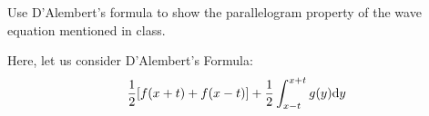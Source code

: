 \item Use D'Alembert's formula to show the parallelogram property of the wave equation mentioned in class.
\bigbreak

Here, let us consider D'Alembert's Formula:
%
\begin{align}
  \frac{1}{2}[f(x + t) + f(x - t)] + \frac{1}{2} \int^{x + t}_{x - t} g(y)
  \text dy
\end{align}

